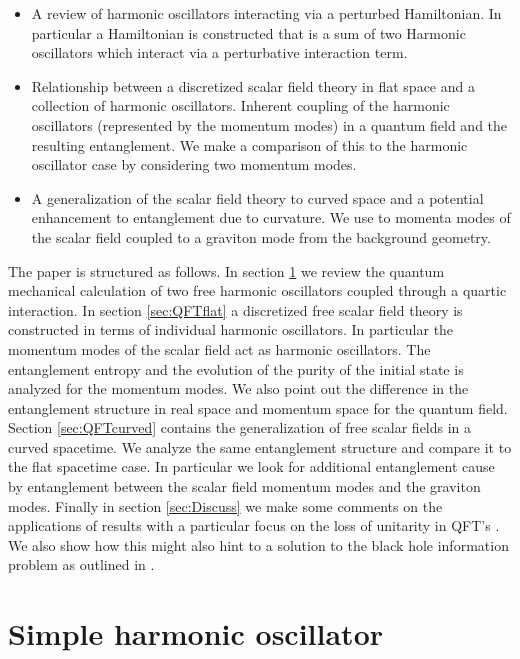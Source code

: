 \documentclass[aps,showpacs,onecolumn,floats,prd,superscriptaddress,nofootinbib]{revtex4-1}
\begin{document}
\begin{itemize}

\item A review of harmonic oscillators interacting via a perturbed Hamiltonian. 
In particular a Hamiltonian is constructed that is a sum of two Harmonic oscillators which interact via a perturbative interaction term.

\item Relationship between a discretized scalar field theory in flat space and a collection of harmonic oscillators. 
Inherent coupling of the harmonic oscillators (represented by the momentum modes) in a quantum field and the resulting entanglement. 
We make a comparison of this to the harmonic oscillator case by considering two momentum modes.


\item A generalization of the scalar field theory to curved space and a potential enhancement to entanglement due to curvature. 
We use to momenta modes of the scalar field coupled to a graviton mode from the background geometry. 

\end{itemize}

The paper is structured as follows. 
In section \ref{sec:QM} we review the quantum mechanical calculation of two free harmonic oscillators coupled through a quartic interaction. 
In section \ref{sec:QFTflat} a discretized free scalar field theory is constructed in terms of individual harmonic oscillators. 
In particular the momentum modes of the scalar field act as harmonic oscillators. 
The entanglement entropy and the evolution of the purity of the initial state is analyzed for the momentum modes. 
We also point out the difference in the entanglement structure in real space and momentum space for the quantum field. 
Section \ref{sec:QFTcurved} contains the generalization of free scalar fields in a curved spacetime. 
We analyze the same entanglement structure and compare it to the flat spacetime case. 
In particular we look for additional entanglement cause by entanglement between the scalar field momentum modes and the graviton modes. 
Finally in section \ref{sec:Discuss} we make some comments on the applications of results with a particular focus on the loss of unitarity in QFT's \cite{isheng1}. 
We also show how this might also hint to a solution to the black hole information problem as outlined in \cite{Baker:2017sgx}.

\section{Simple harmonic oscillator} \label{sec:QM}
\end{document}
